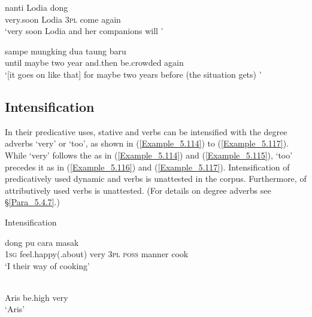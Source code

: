 \ea
\label{Example_5.112}
\gll  nanti  Lodia  dong    \\
 very.soon  Lodia  \textsc{3pl}  come  again\\
\glt 
‘very soon Lodia and her companions will ’ \textstyleExampleSource{[081006-016-Cv.0010]}
\z

\ea
\label{Example_5.113}
\gll {{\ldots}} {sampe} {mungking} {dua} {taung} {baru} {} {}\\ %
 { }    until  maybe  two  year  and.then  be.crowded  again\\
\glt
‘[it goes on like that] for maybe two years before (the situation gets) ’ \textstyleExampleSource{[081025-004-Cv.0102]}
\z


\subsection{Intensification}
\label{Para_5.3.4}
In their predicative uses,  stative and  verbs can be intensified with the degree adverbs  ‘very’ or  ‘too’, as shown in (\ref{Example_5.114}) to (\ref{Example_5.117}). While  ‘very’ follows the  as in (\ref{Example_5.114}) and (\ref{Example_5.115}),  ‘too’ precedes it as in (\ref{Example_5.116}) and (\ref{Example_5.117}). Intensification of predicatively used  dynamic and  verbs is unattested in the corpus. Furthermore,  of attributively used verbs is unattested. (For details on degree adverbs see §\ref{Para_5.4.7}.)


\begin{styleExampleTitle}
Intensification
\end{styleExampleTitle}

\ea
\label{Example_5.114}
 {} {} {dong} {pu} {cara} {masak}\\ %
 \textsc{1sg}  feel.happy(.about)  very  \textsc{3pl}  \textsc{poss}  manner  cook\\
\glt 
‘I  their way of cooking’ \textstyleExampleSource{[081014-017-CvPr.0029]}
\z

\ea
\label{Example_5.115}
 {} {}\\ %
 Aris  be.high  very\\
\glt 
‘Aris’ \textstyleExampleSource{[080922-001b-CvPh.0026]}
\z

